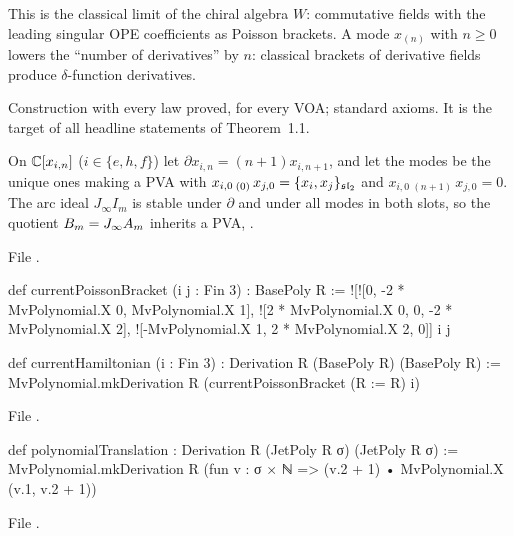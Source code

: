 \begin{physics}
This is the classical limit of the chiral algebra $W$: commutative fields with the leading singular OPE
coefficients as Poisson brackets. A mode $x_{(n)}$ with $n\ge0$ lowers the ``number of derivatives'' by $n$:
classical brackets of derivative fields produce $\delta$-function derivatives.
\end{physics}

\begin{status}
Construction with every law proved, for every VOA; standard axioms. It is the target of all headline
statements of Theorem~1.1.
\end{status}

\begin{definition}\label{l20:def:arcpva}
On ${\mathbb{C}}[x_{i,n}]$ ($i\in\{e,h,f\}$) let $\partial x_{i,n}=(n+1)x_{i,n+1}$, and let the modes be the unique ones
making a PVA with $x_{i,0}\,{}_{(0)}\,x_{j,0}=\{x_i,x_j\}_{\mathfrak{sl}_2}$ and $x_{i,0}\,{}_{(n+1)}\,x_{j,0}=0$. The arc
ideal $J_\infty I_m$ is stable under $\partial$ and under all modes in both slots, so the quotient
$B_m=J_\infty A_m$ inherits a PVA, .
\end{definition}
\noindent File .
\begin{leancode}
def currentPoissonBracket (i j : Fin 3) : BasePoly R :=
  ![![0, -2 * MvPolynomial.X 0, MvPolynomial.X 1],
    ![2 * MvPolynomial.X 0, 0, -2 * MvPolynomial.X 2],
    ![-MvPolynomial.X 1, 2 * MvPolynomial.X 2, 0]] i j

def currentHamiltonian (i : Fin 3) : Derivation R (BasePoly R) (BasePoly R) :=
  MvPolynomial.mkDerivation R (currentPoissonBracket (R := R) i)
\end{leancode}
\noindent File .
\begin{leancode}
def polynomialTranslation : Derivation R (JetPoly R σ) (JetPoly R σ) :=
  MvPolynomial.mkDerivation R (fun v : σ × ℕ =>
    (v.2 + 1) • MvPolynomial.X (v.1, v.2 + 1))
\end{leancode}
\noindent File .
